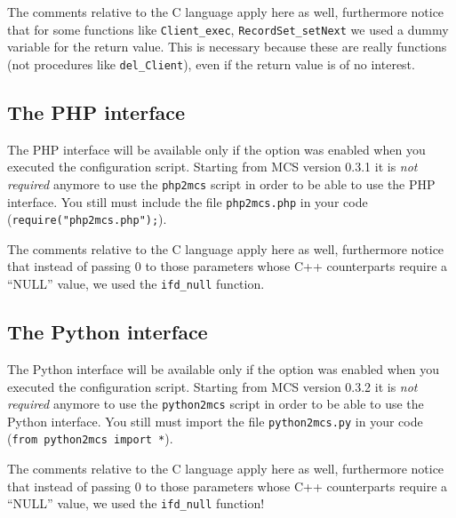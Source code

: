 \documentclass[12pt,titlepage]{article}
\begin{document}
\noindent The comments relative to the C language apply here as
well, furthermore notice that for some functions like
\verb|Client_exec|, \verb|RecordSet_setNext| we used a dummy variable
for the return value. This is necessary because these are really
functions (not procedures like \verb|del_Client|), even if the return
value is of no interest.

%
\subsection{The PHP interface}
\label{sec-The PHP interface}
The PHP interface will be available only if the option was enabled
when you executed the configuration script. Starting from MCS version
0.3.1 it is \emph{not required} anymore to use the \verb|php2mcs|
script in order to be able to use the PHP interface.  You still must
include the file \verb|php2mcs.php| in your code
(\verb|require("php2mcs.php");|).

%

\noindent The comments relative to the C language apply here as
well, furthermore notice that instead of passing 0 to those parameters
whose C++ counterparts require a ``NULL'' value, we used the
\verb|ifd_null| function.

%
\subsection{The Python interface}
\label{sec-The Python interface}
The Python interface will be available only if the option was enabled when
you executed the configuration script.
Starting from MCS version 0.3.2 it is \emph{not required} anymore to use the
\verb|python2mcs| script in order to be able to use the Python interface.
You still must import the file \verb|python2mcs.py| in your code
(\verb|from python2mcs import *|).

\noindent The comments relative to the C language apply here as
well, furthermore notice that instead of passing 0 to those parameters
whose C++ counterparts require a ``NULL'' value, we used the
\verb|ifd_null| function!

%
\end{document}
